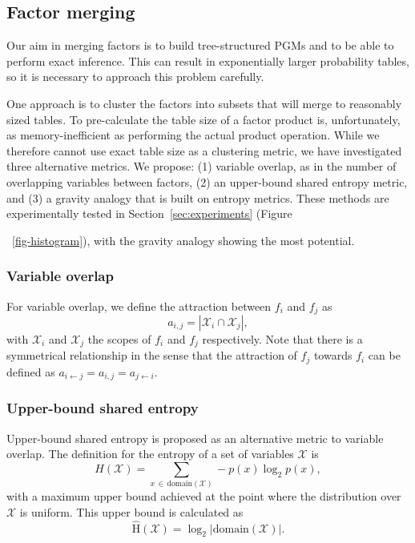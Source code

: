 \documentclass{ieeeaccess}
\begin{document}
\subsection{Factor merging}\label{sec:factorclustering}
Our aim in merging factors is to build tree-structured PGMs and to be able to perform exact inference. This can result in exponentially larger probability tables, so it is necessary to approach this problem carefully.

One approach is to cluster the factors into subsets that will merge to reasonably sized tables. To pre-calculate the table size of a factor product is, unfortunately, as memory-inefficient as performing the actual product operation. While we therefore cannot use exact table size as a clustering metric, we have investigated three alternative metrics. We propose: (1) variable overlap, as in the number of overlapping variables between factors, (2) an upper-bound shared entropy metric, and (3) a gravity analogy that is built on entropy metrics. These methods are experimentally tested in Section{~\ref{sec:experiments}} (Figure{~\ref{fig-histogram}), with the gravity analogy showing the most potential.
	

\subsubsection{Variable overlap}
	For variable overlap, we define the attraction between $f_i$ and $f_j$ as
	\begin{equation*}
		a_{i, j} = \left| \mathcal{X}_i \cap \mathcal{X}_j \right|,
	\end{equation*}
	with $\mathcal{X}_i$ and $\mathcal{X}_j$ the scopes of $f_i$ and $f_j$ respectively. Note that there is a symmetrical relationship in the sense that the attraction of  $f_j$ towards $f_i$ can be defined as $a_{i \leftarrow j} = a_{i,j} = a_{j \leftarrow i}$.


\subsubsection{Upper-bound shared entropy}
	Upper-bound shared entropy is proposed as an alternative metric to variable overlap. The definition for the entropy of a set of variables $\mathcal{X}$ is
	\begin{equation*}
		H(\mathcal{X}) = \sum_{x \, \in \, \text{domain}(\mathcal{X})} -p(x) \log_2 p(x),
	\end{equation*}
	with a maximum upper bound achieved at the point where the distribution over $\mathcal{X}$ is uniform. This upper bound is calculated as
	\begin{equation*}
		\hat{\text{H}}\left(\mathcal{X}\right) = \log_2\left| \text{domain}(\mathcal{X}) \right|.
	\end{equation*}
	
}
\end{document}
